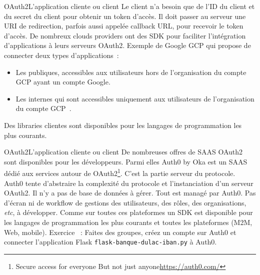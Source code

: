 \documentclass{beamer}
\begin{document}
    \begin{frame}{OAuth2}{L'application cliente ou client}
        Le client n'a besoin que de l'ID du client et du secret du client pour obtenir un token d'accès.
        \bigbreak
        Il doit passer au serveur une URI de redirection, parfois aussi appelée callback URL, pour recevoir le token d'accès.
        \bigbreak
        De nombreux clouds providers ont des SDK pour faciliter l'intégration d'applications à leurs serveurs OAuth2.
        \bigbreak
        Exemple de Google GCP qui propose de connecter deux types d'applications~:
        \begin{itemize}
            \item Les publiques, accessibles aux utilisateurs hors de l'organisation du compte GCP ayant un compte Google.
            \item Les internes qui sont accessibles uniquement aux utilisateurs de l'organisation du compte GCP~.
        \end{itemize}
        Des libraries clientes sont disponibles pour les langages de programmation les plus courants.
    \end{frame}

    \begin{frame}{OAuth2}{L'application cliente ou client}
        De nombreuses offres de SAAS OAuth2 sont disponibles pour les développeurs.
        Parmi elles Auth0 by Oka est un SAAS dédié aux services autour de OAuth2\footnote{Secure access for everyone But not just anyone\url{https://auth0.com/}}.
        \bigbreak
        C'est la partie serveur du protocole.
        Auth0 tente d'abstraire la complexité du protocole et l'instanciation d'un serveur OAuth2.
        Il n'y a pas de base de données à gérer.
        Tout est managé par Auth0.
        Pas d'écran ni de workflow de gestions des utilisateurs, des rôles, des organisations, \textit{etc}, à développer.
        \bigbreak
        Comme sur toutes ces plateformes un SDK est disponible pour les langages de programmation les plus courants et toutes les plateformes (M2M, Web, mobile).
        \bigbreak
        Exercice \execcounterdispinc{}~: Faites des groupes, créez un compte sur Auth0 et connecter l'application Flask \lstinline{flask-banque-dulac-iban.py} à Auth0.
    \end{frame}
\end{document}
